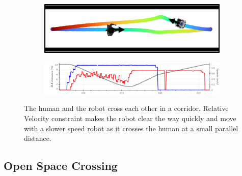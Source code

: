 \begin{figure}[H]
\centering

\begin{subfigure}{0.5\columnwidth}
  \includegraphics[width=\textwidth]{images/appendix/relvel/corridor/with.png}
\end{subfigure}
\begin{subfigure}{0.8\columnwidth}
  \includegraphics[width=\textwidth]{images/appendix/relvel/corridor/corr_with2.png}
\end{subfigure}
\caption{The human and the robot cross each other in a corridor. Relative Velocity constraint makes the robot clear the way quickly and move with a slower speed robot as it crosses the human at a small parallel distance.}
\label{fig:corridor_rel}
\end{figure} 

\subsection{Open Space Crossing}

